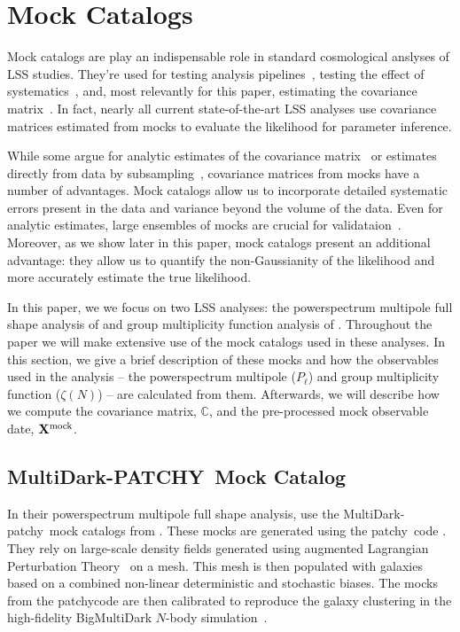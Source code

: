 \documentclass[12pt, letterpaper, preprint]{aastex}
\newcommand{\patchy}{{\fontshape\scdefault\selectfont patchy}}
\begin{document}
\section{Mock Catalogs}
Mock catalogs are play an indispensable role in standard cosmological 
anslyses of LSS studies. They're used for testing analysis 
pipelines~\citep[][]{beutler2017, grieb2017, tinkerinpreparation}, 
testing the effect of systematics~\citep{guo2012, vargas-magana2014, hahn2017, pinol2017, ross2017}, 
and, most relevantly for this paper, estimating the covariance 
matrix~\citep[][]{parkinson2012, kazin2014, grieb2017, alam2017, beutler2017, sinha2017a}. 
In fact, nearly all current state-of-the-art LSS analyses use
covariance matrices estimated from mocks to evaluate the likelihood 
for parameter inference. 

While some argue for analytic estimates of the covariance 
matrix~\citep[e.g.][]{mohammed2017} or estimates directly from data
by subsampling~\citep[e.g.][]{norberg2009}, covariance matrices 
from mocks have a number of advantages. Mock catalogs allow us 
to incorporate detailed systematic errors present in the 
data and variance beyond the volume of the data. Even for analytic 
estimates, large ensembles of mocks are crucial for validataion~\citep{slepian2017}. 
Moreover, as we show later in this paper, mock catalogs present an
additional advantage: they allow us to 
quantify the non-Gaussianity of the likelihood and more accurately 
estimate the true likelihood. 

In this paper, we we focus on two LSS analyses: the powerspectrum 
multipole full shape analysis of \cite{beutler2017} and group multiplicity 
function analysis of \cite{sinha2017a}. Throughout the paper we will 
make extensive use of the mock catalogs used in these analyses. 
In this section, we give a brief description of these mocks and how 
the observables used in the analysis -- the powerspectrum 
multipole ($P_\ell$) and group multiplicity function ($\zeta(N)$) --
are calculated from them. Afterwards, we will describe how we compute 
the covariance matrix, $\mathbb{C}$, and the pre-processed mock observable
date, ${\bf X}^\mathrm{mock}$.

\subsection{MultiDark-PATCHY~Mock Catalog} \label{sec:patchy}
In their powerspectrum multipole full shape analysis, \cite{beutler2017}
use the MultiDark-\patchy~mock catalogs from \cite{kitaura2016}. 
These mocks are generated using the \patchy~code \citep{kitaura2014,kitaura2015}. 
They rely on large-scale density fields generated using augmented
Lagrangian Perturbation Theory~\citep[ALPT;][]{kitaura2013} on a mesh.
This mesh is then populated with galaxies based on a combined non-linear
deterministic and stochastic biases. The mocks from the \patchy code 
are then calibrated to reproduce the galaxy clustering in the 
high-fidelity BigMultiDark $N$-body simulation~\citep{rodriguez-torres2016, klypin2016}. 
\end{document}
